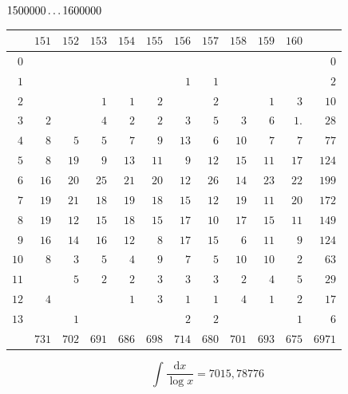 \par\medskip
\noindent\begin{minipage}{\linewidth}\centering
{}
\(1500000\mathinner{.\,.\,.}1600000\)\par\smallskip
\begingroup\fontsize{10.5}{11.5}\selectfont\setlength{\tabcolsep}{3.5pt}\renewcommand{\arraystretch}{1}
\begin{tabular}{r|rrrrrrrrrr|r}\hline
 & $151$ & $152$ & $153$ & $154$ & $155$ & $156$ & $157$ & $158$ & $159$ & $160$ &  \\ \hline
$0$ &  &  &  &  &  &  &  &  &  &  & $0$ \\
$1$ &  &  &  &  &  & $1$ & $1$ &  &  &  & $2$ \\
$2$ &  &  & $1$ & $1$ & $2$ &  & $2$ &  & $1$ & $3$ & $10$ \\
$3$ & $2$ &  & $4$ & $2$ & $2$ & $3$ & $5$ & $3$ & $6$ & $1\mathord{.}$ & $28$ \\
$4$ & $8$ & $5$ & $5$ & $7$ & $9$ & $13$ & $6$ & $10$ & $7$ & $7$ & $77$ \\
$5$ & $8$ & $19$ & $9$ & $13$ & $11$ & $9$ & $12$ & $15$ & $11$ & $17$ & $124$ \\
$6$ & $16$ & $20$ & $25$ & $21$ & $20$ & $12$ & $26$ & $14$ & $23$ & $22$ & $199$ \\
$7$ & $19$ & $21$ & $18$ & $19$ & $18$ & $15$ & $12$ & $19$ & $11$ & $20$ & $172$ \\
$8$ & $19$ & $12$ & $15$ & $18$ & $15$ & $17$ & $10$ & $17$ & $15$ & $11$ & $149$ \\
$9$ & $16$ & $14$ & $16$ & $12$ & $8$ & $17$ & $15$ & $6$ & $11$ & $9$ & $124$ \\
$10$ & $8$ & $3$ & $5$ & $4$ & $9$ & $7$ & $5$ & $10$ & $10$ & $2$ & $63$ \\
$11$ &  & $5$ & $2$ & $2$ & $3$ & $3$ & $3$ & $2$ & $4$ & $5$ & $29$ \\
$12$ & $4$ &  &  & $1$ & $3$ & $1$ & $1$ & $4$ & $1$ & $2$ & $17$ \\
$13$ &  & $1$ &  &  &  & $2$ & $2$ &  &  & $1$ & $6$ \\
\hline
 & $731$ & $702$ & $691$ & $686$ & $698$ & $714$ & $680$ & $701$ & $693$ & $675$ & $6971$ \\ \hline
\end{tabular}\par\endgroup
\setlength{\abovedisplayskip}{6pt}\setlength{\belowdisplayskip}{4pt}
\[\int\frac{\mathrm{d}x}{\log x}=7015{,}78776\]
\end{minipage}

